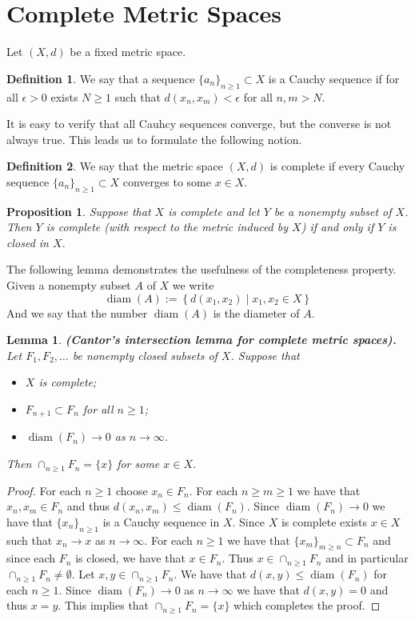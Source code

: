 \documentclass[11pt,a4paper]{article}
\theoremstyle{definition}
\newtheorem{definition}{Definition}[section]
\theoremstyle{plain}
\newtheorem{proposition}[theorem]{Proposition}
\newtheorem{lemma}[theorem]{Lemma}
\DeclareMathOperator{\diam}{diam}
\newcommand{\set}[2]{ \left\{ #1 \mid #2 \right\} }
\renewcommand{\tt}[1]{\textnormal{\textbf{(#1).}}} %
\begin{document}
	\section{Complete Metric Spaces}
	Let $(X,d)$ be a fixed metric space.
	\begin{definition}
		We say that a sequence $\{a_n\}_{n \geq 1} \subset X$ is a Cauchy
		sequence if for all $\epsilon > 0$ exists $N \geq 1$ such that 
		$d(x_n,x_m) < \epsilon$ for all $n,m > N$.
	\end{definition}
	It is easy to verify that all Cauhcy sequences converge, but the converse
	is not always true. This leads us to formulate the following notion.
	\begin{definition}
		We say that the metric space $(X,d)$ is complete if every Cauchy
		sequence $\{a_n\}_{n \geq 1} \subset X$ converges to some $x \in X$.
	\end{definition}
	\begin{proposition}
		Suppose that $X$ is complete and let $Y$ be a nonempty subset of $X$. 
		Then $Y$ is complete (with respect to the metric induced by $X$) if and 
		only if $Y$ is closed in $X$.
	\end{proposition}
	The following lemma demonstrates the usefulness of the completeness property.
	Given a nonempty subset $A$ of $X$ we write
	\[
		\diam(A) := \set{d(x_1,x_2)}{x_1,x_2 \in X}
	\]
	And we say that the number $\diam(A)$ is the diameter of $A$.
	\begin{lemma}
		\tt{Cantor’s intersection lemma for complete metric spaces}
		Let $F_1,F_2,\dots$ be nonempty closed subsets of $X$. Suppose that
		\begin{itemize}
			\item $X$ is complete;
			\item $F_{n+1} \subset F_{n}$ for all $n \geq 1$;
			\item $\diam(F_n) \to 0$ as $n \to \infty$.
		\end{itemize}
		Then $\cap_{n \geq 1}{F_n} = \{x\}$ for some $x \in X$.
	\end{lemma}
	\begin{proof}
		For each $n \geq 1$ choose $x_n \in F_n$. For each $n \geq m \geq 1$
		we have that $x_n,x_m \in F_n$ and thus $d(x_n,x_m) \le \diam(F_n)$.
		Since $\diam(F_n) \to 0$ we have that $\{x_n\}_{n \geq 1}$ is a Cauchy
		sequence in $X$. Since $X$ is complete exists $x \in X$ such that 
		$x_n \to x$ as $n \to \infty$. For each $n \geq 1$ we have that 
		$\{x_m\}_{m \geq n} \subset F_n$ and since each $F_n$ is closed, we
		have that $x \in F_n$. Thus $x \in \cap_{n \geq 1}{F_n}$ and in 
		particular $\cap_{n \geq 1}{F_n} \neq \emptyset$. Let 
		$x,y \in \cap_{n \geq 1}{F_n}$. We have that $d(x,y) \le \diam(F_n)$
		for each $n \geq 1$. Since $\diam(F_n) \to 0$ as $n \to \infty$ we
		have that $d(x,y) = 0$ and thus $x=y$. This implies that
		$\cap_{n \geq 1}{F_n} = \{x\}$ which completes the proof.
	\end{proof}
\end{document}
